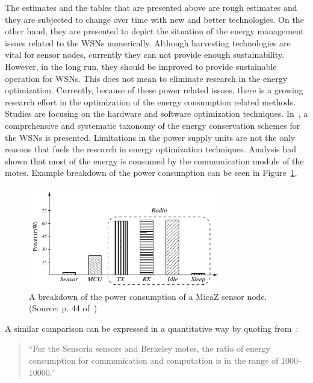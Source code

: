 \documentclass[12pt, oneandhalf, chaparabic, sees, ms]{metu}
\begin{document}
The estimates and the tables that are presented above are rough estimates and they are subjected to change over time with new and better technologies. 
On the other hand, they are presented to depict the situation of the energy management issues related to the WSNs numerically. 
Although harvesting technologies are vital for sensor nodes, currently they can not 
provide enough sustainability. However, in the long run, they should be improved to provide sustainable operation for WSNs. This does not mean to eliminate
research in the energy optimization. Currently, because of these power related issues, there is a growing research effort in the optimization of the energy consumption related
methods. Studies are focusing on the hardware and software optimization techniques.
In~\cite{anastasi2009}, a comprehensive and 
systematic taxonomy of the energy conservation schemes for the WSNs is presented. Limitations in the power supply units are not the only reasons that fuels the research in
energy optimization techniques. Analysis had shown that most of the energy is 
consumed by the communication module of the motes. Example breakdown of the power consumption can be seen in Figure~\ref{fig:power-cons}.
% 
%
%
\begin{figure}[!htbp]
 \begin{center}
  \includegraphics[width=0.75\textwidth]{power-cons.png}
 \end{center}
 \caption{A breakdown of the power consumption of a MicaZ sensor node. (Source: p. 44 of~\protect\cite{akyildiz2010-3})}
  \label{fig:power-cons}
\end{figure}
% 
%
%
\newpage


A similar comparison can be expressed in a quantitative way by quoting from~\cite{zhao2003}:
\begin{quote}
\enquote{For the Sensoria sensors and Berkeley motes, the ratio of energy
consumption for communication and computation is in the
range of 1000–10000.}
\end{quote}
% 
%
%
\end{document}
